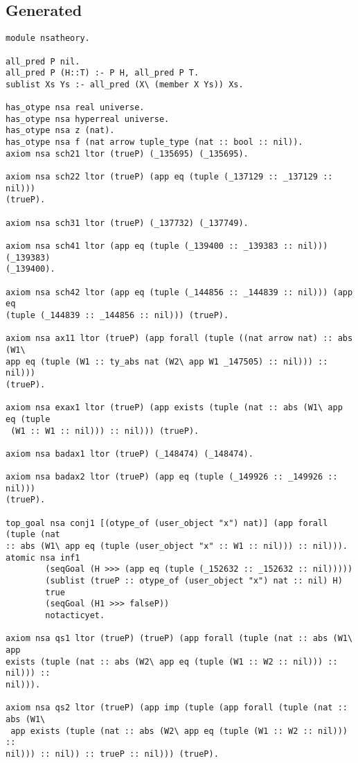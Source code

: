 \subsection{Generated \lclam}\label{lclam}
\begin{verbatim}
module nsatheory.

all_pred P nil.
all_pred P (H::T) :- P H, all_pred P T.
sublist Xs Ys :- all_pred (X\ (member X Ys)) Xs.

has_otype nsa real universe.
has_otype nsa hyperreal universe.
has_otype nsa z (nat).
has_otype nsa f (nat arrow tuple_type (nat :: bool :: nil)).
axiom nsa sch21 ltor (trueP) (_135695) (_135695).

axiom nsa sch22 ltor (trueP) (app eq (tuple (_137129 :: _137129 :: nil))) 
(trueP).

axiom nsa sch31 ltor (trueP) (_137732) (_137749).

axiom nsa sch41 ltor (app eq (tuple (_139400 :: _139383 :: nil))) (_139383) 
(_139400).

axiom nsa sch42 ltor (app eq (tuple (_144856 :: _144839 :: nil))) (app eq 
(tuple (_144839 :: _144856 :: nil))) (trueP).

axiom nsa ax11 ltor (trueP) (app forall (tuple ((nat arrow nat) :: abs (W1\ 
app eq (tuple (W1 :: ty_abs nat (W2\ app W1 _147505) :: nil))) :: nil))) 
(trueP).

axiom nsa exax1 ltor (trueP) (app exists (tuple (nat :: abs (W1\ app eq (tuple
 (W1 :: W1 :: nil))) :: nil))) (trueP).

axiom nsa badax1 ltor (trueP) (_148474) (_148474).

axiom nsa badax2 ltor (trueP) (app eq (tuple (_149926 :: _149926 :: nil))) 
(trueP).

top_goal nsa conj1 [(otype_of (user_object "x") nat)] (app forall (tuple (nat 
:: abs (W1\ app eq (tuple (user_object "x" :: W1 :: nil))) :: nil))).
atomic nsa inf1
        (seqGoal (H >>> (app eq (tuple (_152632 :: _152632 :: nil)))))
        (sublist (trueP :: otype_of (user_object "x") nat :: nil) H)
        true
        (seqGoal (H1 >>> falseP))
        notacticyet.

axiom nsa qs1 ltor (trueP) (trueP) (app forall (tuple (nat :: abs (W1\ app 
exists (tuple (nat :: abs (W2\ app eq (tuple (W1 :: W2 :: nil))) :: nil))) :: 
nil))).

axiom nsa qs2 ltor (trueP) (app imp (tuple (app forall (tuple (nat :: abs (W1\
 app exists (tuple (nat :: abs (W2\ app eq (tuple (W1 :: W2 :: nil))) :: 
nil))) :: nil)) :: trueP :: nil))) (trueP).


\end{verbatim}
